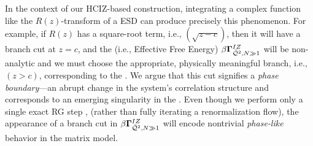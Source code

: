 In the context of our HCIZ-based construction, integrating a complex function like the $R(z)$-transform of
a \HeavyTailed ESD can produce precisely this phenomenon.
For example, if $R(z)$ has a square-root term, i.e., $(\sqrt{z-c})$, then it will have a branch cut at $z=c$,
and the \GeneratingFunction (i.e.,  Effective Free Energy) $\beta\mathbf{\Gamma}^{IZ}_{\bar{\mathcal{Q}}^{2},N\gg 1}$
will be non-analytic and we must choose the appropriate, physically meaningful branch, i.e., $(z>c)$,
corresponding to the \ECS.
We argue that this cut signifies a \emph{phase boundary}—an abrupt change
in the system’s correlation structure and corresponds to an emerging singularity in the \LayerQuality.
Even though we perform only a single exact RG step , 
(rather than fully iterating a renormalization flow), the appearance of a branch cut in $\beta\mathbf{\Gamma}^{IZ}_{\bar{\mathcal{Q}}^{2},N\gg 1}$ will encode
nontrivial \emph{phase-like} behavior in the \SETOL \HeavyTailed matrix model.
